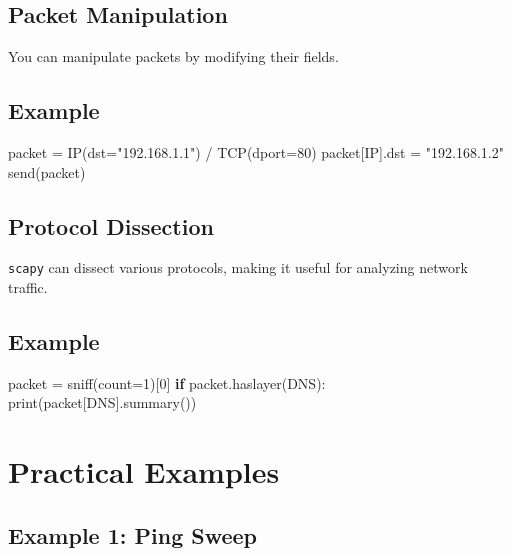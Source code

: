 \documentclass[
  letterpaper,
  DIV=11,
  numbers=noendperiod]{scrreprt}
\newenvironment{Shaded}{\begin{snugshade}}{\end{snugshade}}
\newcommand{\BuiltInTok}[1]{\textcolor[rgb]{0.00,0.23,0.31}{#1}}
\newcommand{\ControlFlowTok}[1]{\textcolor[rgb]{0.00,0.23,0.31}{\textbf{#1}}}
\newcommand{\DecValTok}[1]{\textcolor[rgb]{0.68,0.00,0.00}{#1}}
\newcommand{\NormalTok}[1]{\textcolor[rgb]{0.00,0.23,0.31}{#1}}
\newcommand{\OperatorTok}[1]{\textcolor[rgb]{0.37,0.37,0.37}{#1}}
\newcommand{\StringTok}[1]{\textcolor[rgb]{0.13,0.47,0.30}{#1}}
\begin{document}
\subsection{Packet Manipulation}\label{packet-manipulation}

You can manipulate packets by modifying their fields.

\subsection{Example}\label{example-69}

\begin{Shaded}
\begin{Highlighting}[]
\NormalTok{packet }\OperatorTok{=}\NormalTok{ IP(dst}\OperatorTok{=}\StringTok{"192.168.1.1"}\NormalTok{) }\OperatorTok{/}\NormalTok{ TCP(dport}\OperatorTok{=}\DecValTok{80}\NormalTok{)}
\NormalTok{packet[IP].dst }\OperatorTok{=} \StringTok{"192.168.1.2"}
\NormalTok{send(packet)}
\end{Highlighting}
\end{Shaded}

\subsection{Protocol Dissection}\label{protocol-dissection}

\texttt{scapy} can dissect various protocols, making it useful for
analyzing network traffic.

\subsection{Example}\label{example-70}

\begin{Shaded}
\begin{Highlighting}[]
\NormalTok{packet }\OperatorTok{=}\NormalTok{ sniff(count}\OperatorTok{=}\DecValTok{1}\NormalTok{)[}\DecValTok{0}\NormalTok{]}
\ControlFlowTok{if}\NormalTok{ packet.haslayer(DNS):}
    \BuiltInTok{print}\NormalTok{(packet[DNS].summary())}
\end{Highlighting}
\end{Shaded}

\section{Practical Examples}\label{practical-examples-10}

\subsection{Example 1: Ping Sweep}\label{example-1-ping-sweep}
\end{document}
